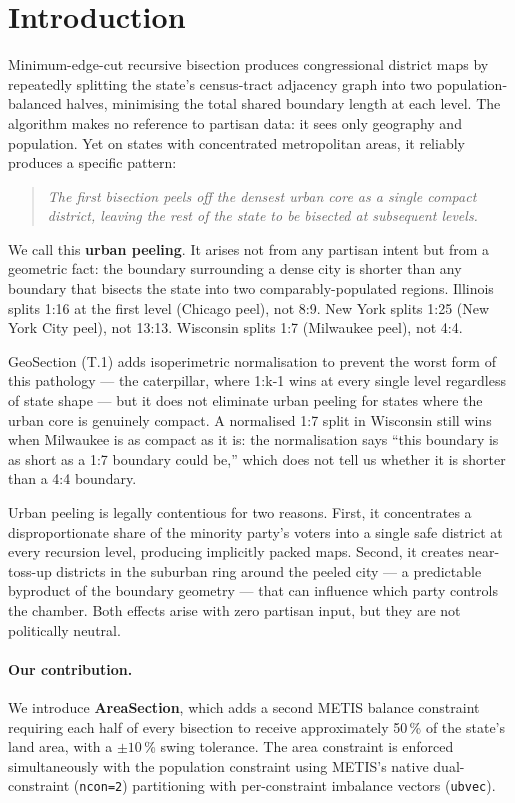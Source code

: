 \section{Introduction}
\label{sec:intro}

Minimum-edge-cut recursive bisection produces congressional district maps by
repeatedly splitting the state's census-tract adjacency graph into two
population-balanced halves, minimising the total shared boundary length at each
level. The algorithm makes no reference to partisan data: it sees only
geography and population. Yet on states with concentrated metropolitan areas,
it reliably produces a specific pattern:

\begin{quote}
\emph{The first bisection peels off the densest urban core as a single compact
district, leaving the rest of the state to be bisected at subsequent levels.}
\end{quote}

We call this \textbf{urban peeling}. It arises not from any partisan intent
but from a geometric fact: the boundary surrounding a dense city is shorter
than any boundary that bisects the state into two comparably-populated regions.
Illinois splits 1:16 at the first level (Chicago peel), not 8:9.
New York splits 1:25 (New York City peel), not 13:13.
Wisconsin splits 1:7 (Milwaukee peel), not 4:4.

GeoSection (T.1) adds isoperimetric normalisation to prevent the worst form
of this pathology --- the caterpillar, where 1:k-1 wins at every single
level regardless of state shape --- but it does not eliminate urban peeling
for states where the urban core is genuinely compact.
A normalised 1:7 split in Wisconsin still wins when Milwaukee is as compact
as it is: the normalisation says ``this boundary is as short as a 1:7 boundary
could be,'' which does not tell us whether it is shorter than a 4:4 boundary.

Urban peeling is legally contentious for two reasons.
First, it concentrates a disproportionate share of the minority party's voters
into a single safe district at every recursion level, producing implicitly
packed maps.
Second, it creates near-toss-up districts in the suburban ring around the
peeled city --- a predictable byproduct of the boundary geometry --- that
can influence which party controls the chamber.
Both effects arise with zero partisan input, but they are not politically
neutral.

\paragraph{Our contribution.}
We introduce \textbf{AreaSection}, which adds a second METIS balance constraint
requiring each half of every bisection to receive approximately 50\,\% of the
state's land area, with a $\pm 10$\,\% swing tolerance.
The area constraint is enforced simultaneously with the population constraint
using METIS's native dual-constraint (\texttt{ncon=2}) partitioning with
per-constraint imbalance vectors (\texttt{ubvec}).

